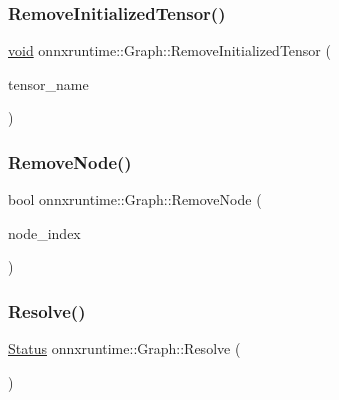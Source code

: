 \mbox{\label{classonnxruntime_1_1Graph_a061af24d8be21ae2367a458cec6e5fc1}} 
\subsubsection{\texorpdfstring{Remove\+Initialized\+Tensor()}{RemoveInitializedTensor()}}
{\footnotesize\ttfamily \mbox{\hyperlink{mlasi_8h_a88f941d423cb2a819b70a1358982b1a6}{void}} onnxruntime\+::\+Graph\+::\+Remove\+Initialized\+Tensor (\begin{DoxyParamCaption}\item[{const std\+::string \&}]{tensor\+\_\+name }\end{DoxyParamCaption})}

\mbox{\label{classonnxruntime_1_1Graph_a44fd12c96e89cbdd1517ae959069d7e1}} 
\subsubsection{\texorpdfstring{Remove\+Node()}{RemoveNode()}}
{\footnotesize\ttfamily bool onnxruntime\+::\+Graph\+::\+Remove\+Node (\begin{DoxyParamCaption}\item[{\mbox{\hyperlink{namespaceonnxruntime_af8773b5c12b5d8fd9292eb2e268df760}{Node\+Index}}}]{node\+\_\+index }\end{DoxyParamCaption})}

\mbox{\label{classonnxruntime_1_1Graph_a339e752e0557c49da5e81e9fa8e3cb54}} 
\subsubsection{\texorpdfstring{Resolve()}{Resolve()}}
{\footnotesize\ttfamily \mbox{\hyperlink{classonnxruntime_1_1common_1_1Status}{Status}} onnxruntime\+::\+Graph\+::\+Resolve (\begin{DoxyParamCaption}{ }\end{DoxyParamCaption})}

